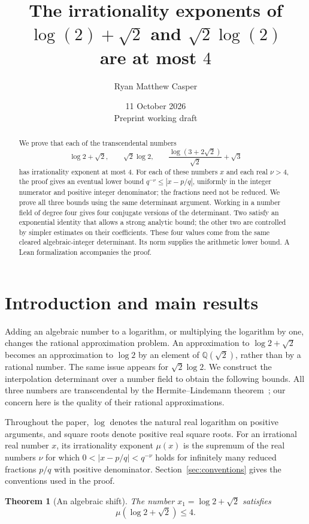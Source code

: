 \documentclass[11pt]{article}
\title{The irrationality exponents of\\
\(\log(2)+\sqrt2\) and \(\sqrt2\log(2)\)\\
are at most \(4\)}
\author{Ryan Matthew Casper}
\date{11 October 2026\\\small Preprint working draft}
\theoremstyle{definition}
\theoremstyle{remark}
\theoremstyle{plain}
\newtheorem{mainthm}{Theorem}
\newcommand{\Q}{\mathbb Q}
\begin{document}
\maketitle

\begin{abstract}
We prove that each of the transcendental numbers
\[
 \log2+\sqrt2,\qquad \sqrt2\log2,\qquad
 \frac{\log(3+2\sqrt2)}{\sqrt2}+\sqrt3
\]
has irrationality exponent at most \(4\). For each of these numbers \(x\) and
each real \(\nu>4\), the proof gives an eventual lower bound
\(q^{-\nu}\le |x-p/q|\), uniformly in the integer numerator and positive
integer denominator; the fractions need not be reduced.
We prove all three bounds using the same determinant argument. Working in
a number field of degree four gives four conjugate versions of the
determinant. Two satisfy an exponential identity that allows a strong
analytic bound; the other two are controlled by simpler estimates on
their coefficients. These four values come from the same cleared
algebraic-integer determinant. Its norm supplies the arithmetic
lower bound. A Lean formalization accompanies the proof.
\end{abstract}

\section{Introduction and main results}\label{sec:intro}
Adding an algebraic number to a logarithm, or multiplying the logarithm by
one, changes the rational approximation problem. An approximation to
\(\log 2+\sqrt2\) becomes an approximation to \(\log 2\) by an element
of \(\Q(\sqrt2)\), rather than by a rational number. The same issue
appears for \(\sqrt2\log2\). We construct the interpolation determinant
over a number field to obtain the following bounds.
All three numbers are transcendental by the Hermite--Lindemann
theorem~\cite[Section~2]{butler}; our concern here is the quality of
their rational approximations.

Throughout the paper, \(\log\) denotes the natural real logarithm on
positive arguments, and square roots denote positive real square roots.
For an irrational real number \(x\), its irrationality exponent \(\mu(x)\)
is the supremum of the real numbers \(\nu\) for which
\(0<|x-p/q|<q^{-\nu}\) holds for infinitely many reduced fractions
\(p/q\) with positive denominator. Section~\ref{sec:conventions}
gives the conventions used in the proof.

\begin{mainthm}[An algebraic shift]\label{thm:shift}
The number \(x_1=\log2+\sqrt2\) satisfies
\[
 \mu(\log2+\sqrt2)\le4.
\]
\end{mainthm}
\end{document}
